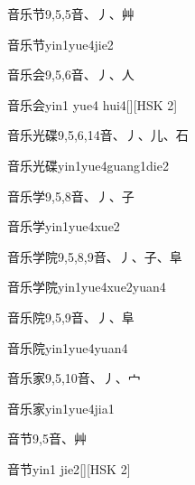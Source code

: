 \begin{entry}{音乐节}{9,5,5}{⾳、⼃、⾋}
  \begin{phonetics}{音乐节}{yin1yue4jie2}
  \end{phonetics}
\end{entry}

\begin{entry}{音乐会}{9,5,6}{⾳、⼃、⼈}
  \begin{phonetics}{音乐会}{yin1 yue4 hui4}[][HSK 2]
  \end{phonetics}
\end{entry}

\begin{entry}{音乐光碟}{9,5,6,14}{⾳、⼃、⼉、⽯}
  \begin{phonetics}{音乐光碟}{yin1yue4guang1die2}
  \end{phonetics}
\end{entry}

\begin{entry}{音乐学}{9,5,8}{⾳、⼃、⼦}
  \begin{phonetics}{音乐学}{yin1yue4xue2}
  \end{phonetics}
\end{entry}

\begin{entry}{音乐学院}{9,5,8,9}{⾳、⼃、⼦、⾩}
  \begin{phonetics}{音乐学院}{yin1yue4xue2yuan4}
  \end{phonetics}
\end{entry}

\begin{entry}{音乐院}{9,5,9}{⾳、⼃、⾩}
  \begin{phonetics}{音乐院}{yin1yue4yuan4}
  \end{phonetics}
\end{entry}

\begin{entry}{音乐家}{9,5,10}{⾳、⼃、⼧}
  \begin{phonetics}{音乐家}{yin1yue4jia1}
  \end{phonetics}
\end{entry}

\begin{entry}{音节}{9,5}{⾳、⾋}
  \begin{phonetics}{音节}{yin1 jie2}[][HSK 2]
  \end{phonetics}
\end{entry}

